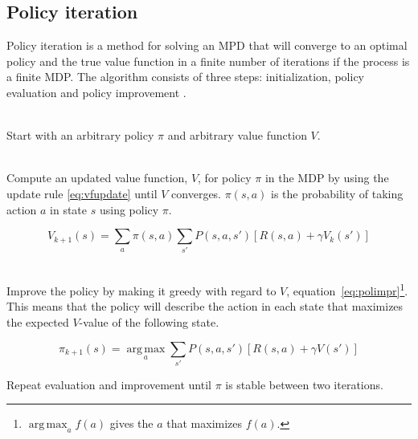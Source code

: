 \subsection{Policy iteration}
\label{sec:pol_itr}

Policy iteration is a method for solving an MPD that will converge to an
optimal policy and the true value function in a finite number of iterations if
the process is a finite MDP. The algorithm consists of three steps:
initialization, policy evaluation and policy improvement
\parencite{barto1998reinforcement}.

\begin{description}
\item[Initialization] \hfill \\
    Start with an arbitrary policy $\pi$ and arbitrary value function $V$.

\item[Policy evaluation] \hfill \\
  Compute an updated value function, $V$, for policy $\pi$ in the MDP by using
  the update rule \eqref{eq:vfupdate} until $V$ converges. $\pi(s, a)$ is the
  probability of taking action $a$ in state $s$ using policy $\pi$.

\begin{equation} \label{eq:vfupdate}
  V_{k+1} (s) = \sum_a \pi(s, a) \sum_{s'} P(s, a, s') \left[ R(s, a) + \gamma V_k(s')  \right]
\end{equation}

\item[Policy improvement] \hfill \\
  Improve the policy by making it greedy with regard to $V$,
  equation~\eqref{eq:polimpr}\footnote{$\operatorname*{arg\,max} _a f(a)$ gives
  the $a$ that maximizes $f(a)$.}. This means that the policy will describe the
  action in each state that maximizes the expected $V$-value of the following
  state. 

\begin{equation} \label{eq:polimpr}
  \pi_{k+1} (s) = \operatorname*{arg\,max}_a \sum_{s'}P(s, a, s') \left[ R(s, a) + \gamma V(s') \right]
\end{equation}

\item Repeat evaluation and improvement until $\pi$ is stable between two iterations.
\end{description}


